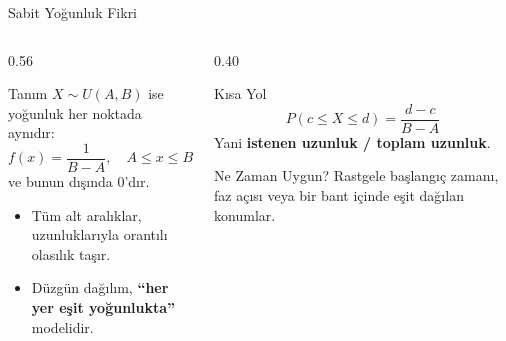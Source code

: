 \documentclass[light]{lutbeamer}
\begin{document}
\begin{frame}{Sabit Yoğunluk Fikri}
\small
\begin{columns}[T,onlytextwidth]
    \begin{column}{0.56\textwidth}
        \begin{block}{Tanım}
            $X \sim U(A,B)$ ise yoğunluk her noktada aynıdır:
            \[
            f(x)=\frac{1}{B-A}, \quad A \le x \le B
            \]
            ve bunun dışında $0$'dır.
        \end{block}

        \begin{itemize}
            \item Tüm alt aralıklar, uzunluklarıyla orantılı olasılık taşır.
            \item Düzgün dağılım, \textbf{``her yer eşit yoğunlukta''} modelidir.
        \end{itemize}
    \end{column}
    \begin{column}{0.40\textwidth}
        \begin{exampleblock}{Kısa Yol}
            \[
            P(c \le X \le d)=\frac{d-c}{B-A}
            \]
            Yani \textbf{istenen uzunluk / toplam uzunluk}.
        \end{exampleblock}

        \begin{alertblock}{Ne Zaman Uygun?}
            Rastgele başlangıç zamanı, faz açısı veya bir bant içinde eşit dağılan konumlar.
        \end{alertblock}
    \end{column}
\end{columns}
\end{frame}
\end{document}

